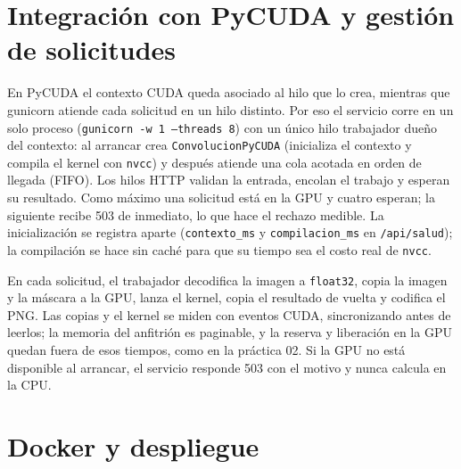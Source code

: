 \documentclass[12pt]{article}
\begin{document}
\section{Integración con PyCUDA y gestión de solicitudes}

En PyCUDA el contexto CUDA queda asociado al hilo que lo crea, mientras que gunicorn atiende cada
solicitud en un hilo distinto. Por eso el servicio corre en un solo proceso
(\texttt{gunicorn -w 1 --threads 8}) con un único hilo trabajador dueño del contexto: al arrancar
crea \texttt{ConvolucionPyCUDA} (inicializa el contexto y compila el kernel con \texttt{nvcc}) y
después atiende una cola acotada en orden de llegada (FIFO). Los hilos HTTP validan la entrada,
encolan el trabajo y esperan su resultado. Como máximo una solicitud está en la GPU y cuatro esperan;
la siguiente recibe 503 de inmediato, lo que hace el rechazo medible. La inicialización se registra
aparte (\texttt{contexto\_ms} y \texttt{compilacion\_ms} en \texttt{/api/salud}); la compilación se
hace sin caché para que su tiempo sea el costo real de \texttt{nvcc}.

En cada solicitud, el trabajador decodifica la imagen a \texttt{float32}, copia la imagen y la máscara
a la GPU, lanza el kernel, copia el resultado de vuelta y codifica el PNG. Las copias y el kernel se
miden con eventos CUDA, sincronizando antes de leerlos; la memoria del anfitrión es paginable, y la
reserva y liberación en la GPU quedan fuera de esos tiempos, como en la práctica 02. Si la GPU no está
disponible al arrancar, el servicio responde 503 con el motivo y nunca calcula en la CPU.

\section{Docker y despliegue}
\end{document}
